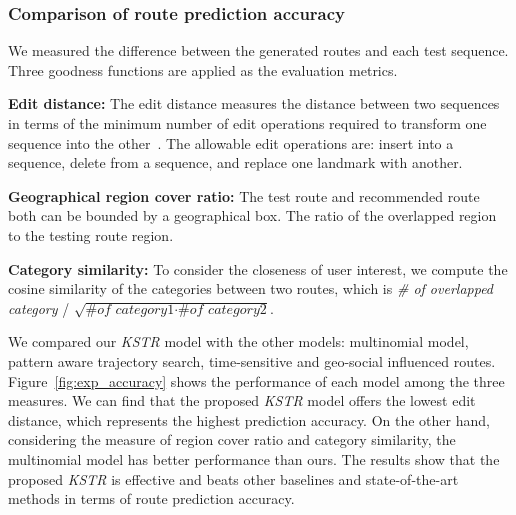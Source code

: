 \subsubsection{Comparison of route prediction accuracy}
We measured the difference between the generated routes and each test sequence. Three goodness functions are applied as the evaluation metrics.

\noindent\textbf{Edit distance:} 
The edit distance measures the distance between two sequences in terms of the minimum number of edit operations required to transform one sequence into the other~\cite{kurashima2010travel}. The allowable edit operations are: insert into a sequence, delete from a sequence, and replace one landmark with another.

\noindent\textbf{Geographical region cover ratio:}
The test route and recommended route both can be bounded by a geographical box. The ratio of the overlapped region to the testing route region.

\noindent\textbf{Category similarity:}
To consider the closeness of user interest, we compute the cosine similarity of the categories between two routes, which is \textit{\# of overlapped category} / $\sqrt{\textit{\# of category1}\cdot\textit{\# of category2} }$.

We compared our \textit{KSTR} model with the other models: multinomial model, pattern aware trajectory search, time-sensitive and geo-social influenced routes. Figure~\ref{fig:exp_accuracy} shows the performance of each model among the three measures. We can find that the proposed \textit{KSTR} model offers the lowest edit distance, which represents the highest prediction accuracy. On the other hand, considering the measure of region cover ratio and category similarity, the multinomial model has better performance than ours. The results show that the proposed \textit{KSTR} is effective and beats other baselines and state-of-the-art methods in terms of route prediction accuracy. %


